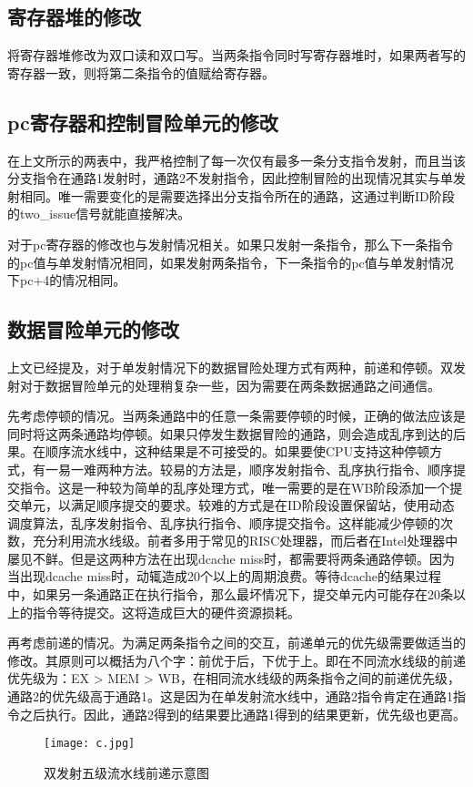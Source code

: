 \documentclass{article}
\begin{document}
        \subsection{寄存器堆的修改}
        将寄存器堆修改为双口读和双口写。当两条指令同时写寄存器堆时，如果两者写的寄存器一致，则将第二条指令的值赋给寄存器。

        \subsection{pc寄存器和控制冒险单元的修改}
        \par{}
        在上文所示的两表中，我严格控制了每一次仅有最多一条分支指令发射，而且当该分支指令在通路1发射时，通路2不发射指令，因此控制冒险的出现情况其实与单发射相同。唯一需要变化的是需要选择出分支指令所在的通路，这通过判断ID阶段的two\_issue信号就能直接解决。
        \par{}
        对于pc寄存器的修改也与发射情况相关。如果只发射一条指令，那么下一条指令的pc值与单发射情况相同，如果发射两条指令，下一条指令的pc值与单发射情况下pc+4的情况相同。

        \subsection{数据冒险单元的修改}
        \par{}
        上文已经提及，对于单发射情况下的数据冒险处理方式有两种，前递和停顿。双发射对于数据冒险单元的处理稍复杂一些，因为需要在两条数据通路之间通信。
        \par{}
        先考虑停顿的情况。当两条通路中的任意一条需要停顿的时候，正确的做法应该是同时将这两条通路均停顿。如果只停发生数据冒险的通路，则会造成乱序到达的后果。在顺序流水线中，这种结果是不可接受的。如果要使CPU支持这种停顿方式，有一易一难两种方法。较易的方法是，顺序发射指令、乱序执行指令、顺序提交指令。这是一种较为简单的乱序处理方式，唯一需要的是在WB阶段添加一个提交单元，以满足顺序提交的要求。较难的方式是在ID阶段设置保留站，使用动态调度算法，乱序发射指令、乱序执行指令、顺序提交指令。这样能减少停顿的次数，充分利用流水线级。前者多用于常见的RISC处理器，而后者在Intel处理器中屡见不鲜。但是这两种方法在出现dcache miss时，都需要将两条通路停顿。因为当出现dcache miss时，动辄造成20个以上的周期浪费。等待dcache的结果过程中，如果另一条通路正在执行指令，那么最坏情况下，提交单元内可能存在20条以上的指令等待提交。这将造成巨大的硬件资源损耗。
        \par{}
        再考虑前递的情况。为满足两条指令之间的交互，前递单元的优先级需要做适当的修改。其原则可以概括为八个字：前优于后，下优于上。即在不同流水线级的前递优先级为：EX > MEM > WB，在相同流水线级的两条指令之间的前递优先级，通路2的优先级高于通路1。这是因为在单发射流水线中，通路2指令肯定在通路1指令之后执行。因此，通路2得到的结果要比通路1得到的结果更新，优先级也更高。
        \begin{figure}[ht]
            \centering
            \texttt{[image: c.jpg]}
            \caption{双发射五级流水线前递示意图}
        \end{figure}
\end{document}
